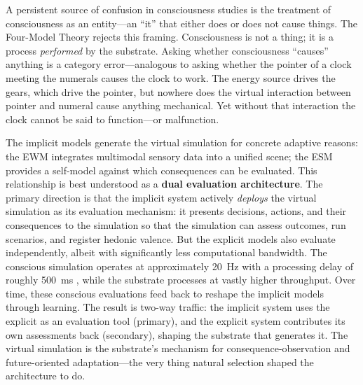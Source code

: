 \documentclass[12pt]{article}
\begin{document}
A persistent source of confusion in consciousness studies is the treatment of consciousness as an entity---\hspace{0pt}an ``it'' that either does or does not cause things. The Four-Model Theory rejects this framing. Consciousness is not a thing; it is a process \emph{performed} by the substrate. Asking whether consciousness ``causes'' anything is a category error---\hspace{0pt}analogous to asking whether the pointer of a clock meeting the numerals causes the clock to work. The energy source drives the gears, which drive the pointer, but nowhere does the virtual interaction between pointer and numeral cause anything mechanical. Yet without that interaction the clock cannot be said to function---\hspace{0pt}or malfunction.

The implicit models generate the virtual simulation for concrete adaptive reasons: the EWM integrates multimodal sensory data into a unified scene; the ESM provides a self-model against which consequences can be evaluated. This relationship is best understood as a \textbf{dual evaluation architecture}. The primary direction is that the implicit system actively \emph{deploys} the virtual simulation as its evaluation mechanism: it presents decisions, actions, and their consequences to the simulation so that the simulation can assess outcomes, run scenarios, and register hedonic valence. But the explicit models also evaluate independently, albeit with significantly less computational bandwidth. The conscious simulation operates at approximately 20~Hz with a processing delay of roughly 500~ms \citep{VanRullen2003}, while the substrate processes at vastly higher throughput. Over time, these conscious evaluations feed back to reshape the implicit models through learning. The result is two-way traffic: the implicit system uses the explicit as an evaluation tool (primary), and the explicit system contributes its own assessments back (secondary), shaping the substrate that generates it. The virtual simulation is the substrate's mechanism for consequence-observation and future-oriented adaptation---\hspace{0pt}the very thing natural selection shaped the architecture to do.
\end{document}
